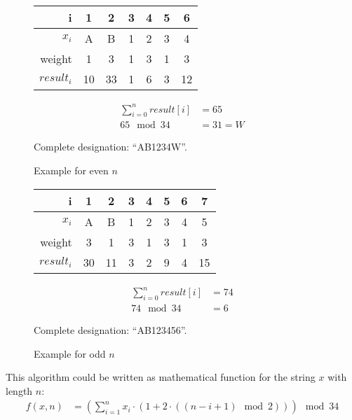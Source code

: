 \begin{multicols}{2}
	\begin{figure}[H]
		\centering

		\begin{tabular}{r|c|c|c|c|c|c}
			i          & 1  & 2  & 3 & 4 & 5 & 6 \\
			\hline
			$x_i$      & A  & B  & 1 & 2 & 3 & 4 \\
			weight     & 1  & 3  & 1 & 3 & 1 & 3 \\
			\hline
			$result_i$ & 10 & 33 & 1 & 6 & 3 & 12 \\
		\end{tabular}

		\begin{align*}
			\sum_{i=0}^{n} result[i] &= 65 \\
			65 \mod 34 &= 31 = W
		\end{align*}

		Complete designation: ``AB1234W''.

		\caption{Example for even $n$}
	\end{figure}

	\begin{figure}[H]
		\centering

		\begin{tabular}{r|c|c|c|c|c|c|c}
			i          & 1  & 2  & 3 & 4 & 5 & 6 & 7 \\
			\hline
			$x_i$      & A  & B  & 1 & 2 & 3 & 4 & 5 \\
			weight     & 3  & 1  & 3 & 1 & 3 & 1 & 3 \\
			\hline
			$result_i$ & 30 & 11 & 3 & 2 & 9 & 4 & 15 \\
		\end{tabular}

		\begin{align*}
			\sum_{i=0}^{n} result[i] &= 74 \\
			74 \mod 34 &= 6
		\end{align*}

		Complete designation: ``AB123456''.

		\caption{Example for odd $n$}
	\end{figure}
\end{multicols}


This algorithm could be written as mathematical function for the string $x$ with
length $n$:
\begin{align*}
	f(x, n) &= \left(\sum_{i=1}^{n} x_i \cdot \left(1 + 2 \cdot \left( \left(
		n - i + 1 \right) \mod 2 \right) \right) \right) \mod 34
\end{align*}
